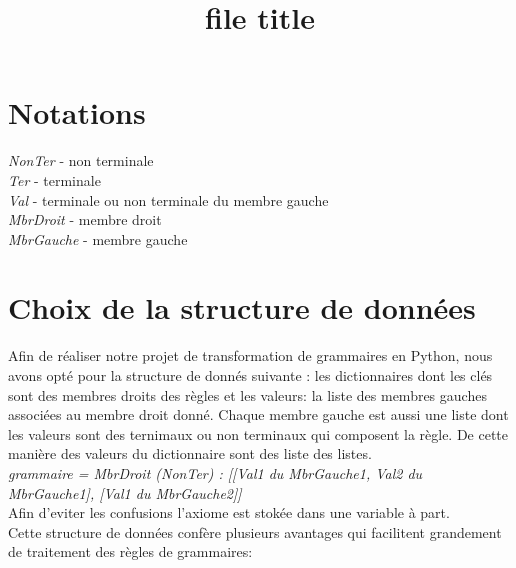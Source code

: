\documentclass{rapport}
\title{file title} %
\begin{document}

\subject{in520} %



        
\buildmargins %
\buildcover %
\toc %

\section{Notations}
\textit{NonTer} - non terminale \\
\textit{Ter} - terminale \\
\textit{Val} - terminale ou non terminale du membre gauche \\
\textit{MbrDroit} - membre droit \\
\textit{MbrGauche} - membre gauche \\

\section{Choix de la structure de données}
Afin de réaliser notre projet de transformation de grammaires en Python, nous avons opté pour la structure de donnés suivante : les dictionnaires dont les clés sont des membres droits des règles et les valeurs: la liste des membres gauches associées au membre droit donné. Chaque membre gauche est aussi une liste dont les valeurs sont des ternimaux ou non terminaux qui composent la règle. De cette manière des valeurs du dictionnaire sont des liste des listes.\\

\textit{grammaire = {MbrDroit (NonTer) : [[Val1 du MbrGauche1, Val2 du MbrGauche1], [Val1 du MbrGauche2]]}}\\

Afin d'eviter les confusions l'axiome est stokée dans une variable à part.\\
Cette structure de données confère plusieurs avantages qui facilitent grandement de traitement des règles de grammaires: \\
\end{document}
